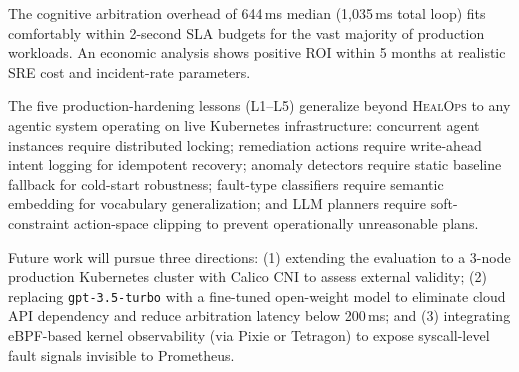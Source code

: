 \documentclass[journal,10pt,twoside]{IEEEtran}
\newcommand{\HealOps}{\textsc{HealOps}}
\begin{document}
The cognitive arbitration overhead of 644\,ms median (1{,}035\,ms total
loop) fits comfortably within 2-second SLA budgets for the vast majority
of production workloads. An economic analysis shows positive ROI within
5 months at realistic SRE cost and incident-rate parameters.

The five production-hardening lessons (L1--L5) generalize beyond
\HealOps{} to any agentic system operating on live Kubernetes
infrastructure: concurrent agent instances require distributed locking;
remediation actions require write-ahead intent logging for idempotent
recovery; anomaly detectors require static baseline fallback for
cold-start robustness; fault-type classifiers require semantic embedding
for vocabulary generalization; and LLM planners require soft-constraint
action-space clipping to prevent operationally unreasonable plans.

Future work will pursue three directions: (1) extending the evaluation
to a 3-node production Kubernetes cluster with Calico CNI to assess
external validity; (2) replacing \texttt{gpt-3.5-turbo} with a
fine-tuned open-weight model to eliminate cloud API dependency and
reduce arbitration latency below 200\,ms; and (3) integrating
eBPF-based kernel observability (via Pixie or Tetragon) to expose
syscall-level fault signals invisible to Prometheus.
\end{document}
